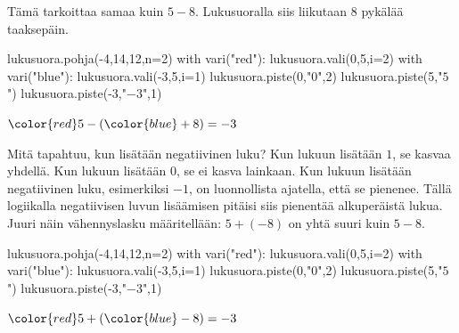    Tämä tarkoittaa samaa kuin $5-8$. Lukusuoralla siis liikutaan 8 pykälää taaksepäin.

\vspace{0.3cm}     
    
\begin{center}
\begin{kuva}
	lukusuora.pohja(-4,14,12,n=2)
	with vari("red"):
		lukusuora.vali(0,5,i=2)
	with vari("blue"): lukusuora.vali(-3,5,i=1)
	lukusuora.piste(0,"$0$",2)
	lukusuora.piste(5,"$5$")
	lukusuora.piste(-3,"$-3$",1)
\end{kuva}
       ${\color{red}5}-({\color{blue}+8})=-3$
\end{center}

    
Mitä tapahtuu, kun lisätään negatiivinen luku? Kun lukuun lisätään $1$, se kasvaa yhdellä. Kun lukuun lisätään $0$, se ei kasva lainkaan. Kun lukuun lisätään negatiivinen luku, esimerkiksi $-1$, on luonnollista ajatella, että se pienenee. Tällä logiikalla negatiivisen luvun lisäämisen pitäisi siis pienentää alkuperäistä lukua. Juuri näin vähennyslasku määritellään: $5+(-8)$ on yhtä suuri kuin $5-8$.
    
\vspace{0.3cm}     
\begin{center}
\begin{kuva}
	lukusuora.pohja(-4,14,12,n=2)
	with vari("red"):
		lukusuora.vali(0,5,i=2)
	with vari("blue"): lukusuora.vali(-3,5,i=1)
	lukusuora.piste(0,"$0$",2)
	lukusuora.piste(5,"$5$")
	lukusuora.piste(-3,"$-3$",1)
\end{kuva}
       ${\color{red}5}+({\color{blue}-8})=-3$
\end{center}
    
